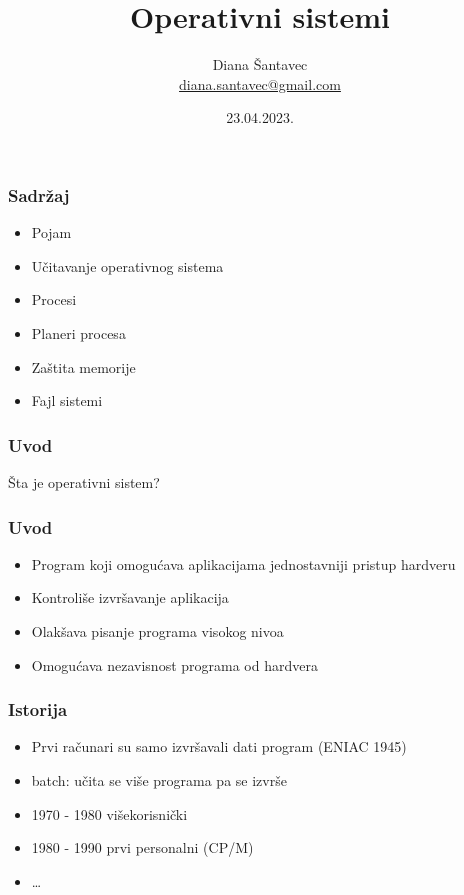 \documentclass{beamer}
\title{Operativni sistemi}
\author[Diana Šantavec]{Diana Šantavec \\ \small \url{diana.santavec@gmail.com}}
\institute{Istraživačka stanica Petnica}
\date{23.04.2023.}
\begin{document}
\frame{\titlepage}


\begin{frame}
\frametitle{Sadržaj}
\begin{itemize}
    \item Pojam \newline
    \item Učitavanje operativnog sistema \newline
    \item Procesi \newline
    \item Planeri procesa \newline
    \item Zaštita memorije \newline
    \item Fajl sistemi
\end{itemize}
\end{frame}

\begin{frame}
    \frametitle{Uvod}
    \begin{center}
        \large{Šta je operativni sistem?}
    \end{center}
\end{frame}


\begin{frame}
    \frametitle{Uvod}
    \begin{itemize}
        \item Program koji omogućava aplikacijama jednostavniji pristup hardveru \newline
        \item Kontroliše izvršavanje aplikacija \newline
        \item Olakšava pisanje programa visokog nivoa \newline
        \item Omogućava nezavisnost programa od hardvera \newline
    \end{itemize}
\end{frame}

\begin{frame}
    \frametitle{Istorija}
    \begin{itemize}
        \item Prvi računari su samo izvršavali dati program (ENIAC 1945) \newline
        \item batch: učita se više programa pa se izvrše \newline
        \item 1970 - 1980 višekorisnički \newline
        \item 1980 - 1990 prvi personalni (CP/M) \newline
        \item \dots
    \end{itemize}
\end{frame}
\end{document}

